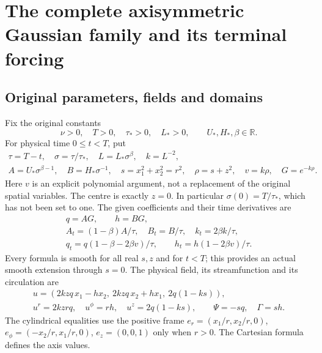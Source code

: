 \section{The complete axisymmetric Gaussian family and its terminal forcing}
\label{sec:axis-gaussian-concentration}

\subsection{Original parameters, fields and domains}

Fix the original constants
\[
 \nu>0,\quad T>0,\quad \tau_*>0,\quad L_*>0,
 \qquad U_*,H_*,\beta\in\mathbb R.
\]
For physical time \(0\leq t<T\), put
\begin{equation}\label{eq:ag-parameters}
 \begin{gathered}
 \tau=T-t,\quad \sigma=\tau/\tau_*,\quad
 L=L_*\sigma^\beta,\quad k=L^{-2},\\
 A=U_*\sigma^{\beta-1},\quad B=H_*\sigma^{-1},\quad
 s=x_1^2+x_2^2=r^2,\quad \rho=s+z^2,\quad v=k\rho,\quad G=e^{-k\rho}.
 \end{gathered}
\end{equation}
Here \(v\) is an explicit polynomial argument, not a replacement of the
original spatial variables.  The centre is exactly \(z=0\).  In particular
\(\sigma(0)=T/\tau_*\), which has not been set to one.  The given
coefficients and their time derivatives are
\begin{equation}\label{eq:ag-coefficients}
 \begin{gathered}
 q=A G,\qquad h=B G,\\
 A_t=(1-\beta)A/\tau,\quad B_t=B/\tau,\quad
 k_t=2\beta k/\tau,\\
 q_t=q(1-\beta-2\beta v)/\tau,\qquad
 h_t=h(1-2\beta v)/\tau.
 \end{gathered}
\end{equation}
Every formula is smooth for all real \(s,z\) and for \(t<T\); this
provides an actual smooth extension through \(s=0\).  The physical field,
its streamfunction and its circulation are
\begin{equation}\label{eq:ag-velocity}
 \begin{gathered}
 u=(2kzq\,x_1-hx_2,\ 2kzq\,x_2+hx_1,\ 2q(1-ks)),\\
 u^r=2kzr q,\quad u^\phi=rh,\quad u^z=2q(1-ks),\qquad
 \Psi=-s q,\quad \Gamma=s h.
 \end{gathered}
\end{equation}
The cylindrical equalities use the positive frame
\(e_r=(x_1/r,x_2/r,0)\), \(e_\phi=(-x_2/r,x_1/r,0)\), \(e_z=(0,0,1)\)
only when \(r>0\).  The Cartesian formula defines the axis values.

